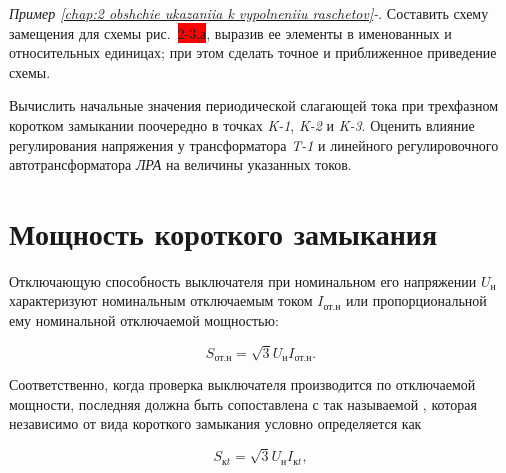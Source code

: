 \begin{small} %
	
	\vspace{1pc}
	\textit{Пример \ref*{chap:2 obshchie ukazaniia k vypolneniiu raschetov}-}.
	Составить схему замещения для схемы рис.~\colorbox{red}{2-3,а}, выразив ее элементы в именованных и относительных единицах;	при этом сделать точное и приближенное приведение схемы.
	
	
	Вычислить начальные значения периодической слагающей тока при трехфазном коротком замыкании поочередно в точках \textit{K-1}, \textit{K-2} и \textit{K-3}.	Оценить влияние регулирования напряжения у трансформатора \textit{T-1} и линейного регулировочного автотрансформатора \textit{ЛРА} на величины указанных токов.
	
	

\end{small}
























\section{Мощность короткого замыкания}
\label{sec:2-7 moshchnost korotkogo zamykaniia}

Отключающую способность выключателя при номинальном его напряжении $ U_{\text{н}} $ характеризуют номинальным отключаемым током $ I_{\text{от.н}} $ или пропорциональной ему номинальной отключаемой мощностью:

\begin{equation*}
	S_{\text{от.н}} = \sqrt{3}U_{\text{н}}I_{\text{от.н}}.
\end{equation*}

Соответственно, когда проверка выключателя производится по отключаемой мощности, последняя должна быть сопоставлена с так называемой , которая независимо от вида короткого замыкания условно определяется как

\begin{equation} %
	\label{eq:2-38 S_kz_v_moment_t}
	S_{\text{к}t} = \sqrt{3}U_{\text{н}}I_{\text{к}t},
\end{equation}

